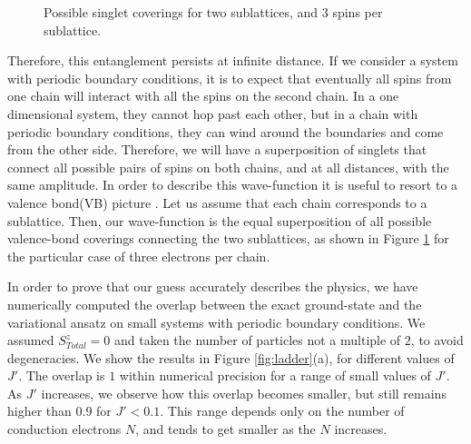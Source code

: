 \documentclass[article,11pt]{revtex4}
\begin{document}
\begin{centering}
\begin{figure}
\caption{Possible singlet coverings for two sublattices, and 3 spins per sublattice.} 
\label{fig:VB1}
\end{figure}
\end{centering}

Therefore, this entanglement persists at infinite distance. If we consider a system with periodic boundary conditions, it is to expect that eventually all spins from one chain will interact with all the spins on the second chain. In a one dimensional system, they cannot hop past each other, but in a chain with periodic boundary conditions, they can wind around the boundaries and come from the other side. Therefore, we will have a superposition of singlets that connect all possible pairs of spins on both chains, and at all distances, with the same amplitude. In order to describe this wave-function it is useful to resort to a valence bond(VB) picture \cite{Pauling1933,Oguchi1989,Beach2006,Tang2011}. Let us assume that each chain corresponds to a sublattice. Then, our wave-function is the equal superposition of all possible valence-bond coverings connecting the two sublattices, as shown in Figure \ref{fig:VB1} for the particular case of three electrons per chain.

In order to prove that our guess accurately describes the physics, we have numerically computed the overlap between the exact ground-state and the variational ansatz on small systems with periodic boundary conditions. We assumed $S^z_{Total}=0$ and taken the number of particles not a multiple of $2$, to avoid degeneracies. We show the results in Figure \ref{fig:ladder}(a), for different values of $J'$. The overlap is $1$ within numerical precision for a range of small values of $J'$. As $J'$ increases, we observe how this overlap becomes smaller, but still remains higher than $0.9$ for $J' < 0.1$. This range depends only on the number of conduction electrons $N$, and tends to get smaller as the $N$ increases. 
\end{document}

